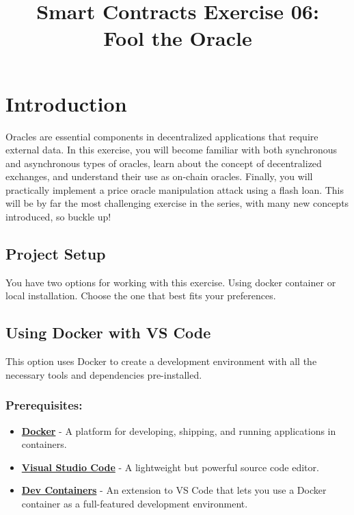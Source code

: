 \documentclass[12pt]{article}
\title{Smart Contracts Exercise 06: \\ Fool the Oracle}
\author{}
\date{}
\begin{document}
\maketitle
\section{Introduction}

Oracles are essential components in decentralized applications that require external data. In this exercise, you will become familiar with both synchronous and asynchronous types of oracles, learn about the concept of decentralized exchanges, and understand their use as on-chain oracles. Finally, you will practically implement a price oracle manipulation attack using a flash loan. This will be by far the most challenging exercise in the series, with many new concepts introduced, so buckle up!

\subsection*{Project Setup}

You have two options for working with this exercise. Using docker container or local installation. Choose the one that best fits your preferences.

\subsection{Using Docker with VS Code}

This option uses Docker to create a development environment with all the necessary tools and dependencies pre-installed.

\subsubsection*{Prerequisites:}

\begin{itemize}
    \item \textbf{\href{https://www.docker.com/products/docker-desktop}{Docker}} - A platform for developing, shipping, and running applications in containers.
    \item \textbf{\href{https://code.visualstudio.com/}{Visual Studio Code}} - A lightweight but powerful source code editor.
    \item \textbf{\href{https://marketplace.visualstudio.com/items?itemName=ms-vscode-remote.remote-containers}{Dev Containers}} - An extension to VS Code that lets you use a Docker container as a full-featured development environment.
\end{itemize}
\end{document}
